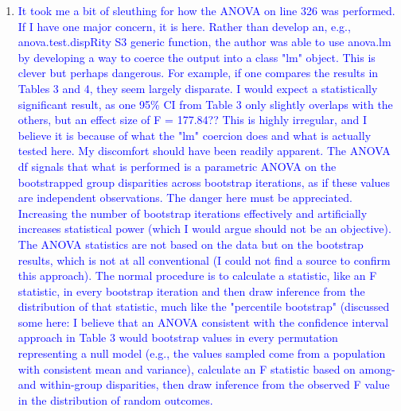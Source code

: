 \documentclass[12pt,letterpaper]{article}
\begin{document}
\begin{enumerate}
\item{\textcolor{blue}{It took me a bit of sleuthing for how the ANOVA on line 326 was performed. 
If I have one major concern, it is here. 
Rather than develop an, e.g., anova.test.dispRity S3 generic function, the author was able to use anova.lm by developing a way to coerce the output into a class "lm" object. 
This is clever but perhaps dangerous. 
For example, if one compares the results in Tables 3 and 4, they seem largely disparate. 
I would expect a statistically significant result, as one 95\% CI from Table 3 only slightly overlaps with the others, but an effect size of F = 177.84?? 
This is highly irregular, and I believe it is because of what the "lm" coercion does and what is actually tested here. 
My discomfort should have been readily apparent. 
The ANOVA df signals that what is performed is a parametric ANOVA on the bootstrapped group disparities across bootstrap iterations, as if these values are independent observations. 
The danger here must be appreciated.
Increasing the number of bootstrap iterations effectively and artificially increases statistical power (which I would argue should not be an objective). 
The ANOVA statistics are not based on the data but on the bootstrap results, which is not at all conventional (I could not find a source to confirm this approach). 
The normal procedure is to calculate a statistic, like an F statistic, in every bootstrap iteration and then draw inference from the distribution of that statistic, much like the "percentile bootstrap" (discussed some here:%
I believe that an ANOVA consistent with the confidence interval approach in Table 3 would bootstrap values in every permutation representing a null model (e.g., the values sampled come from a population with consistent mean and variance), calculate an F statistic based on among- and within-group disparities, then draw inference from the observed F value in the distribution of random outcomes.}}




\end{enumerate}
\end{document}

